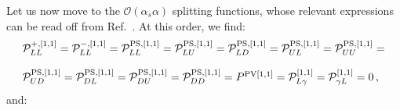 \documentclass[10pt,a4paper]{article}
\begin{document}
Let us now move to the $\mathcal{O}(\alpha_s\alpha)$ splitting
functions, whose relevant expressions can be read off from
Ref.~\cite{deFlorian:2015ujt}. At this order, we find:
\begin{equation}
\begin{array}{l}
\mathcal{P}_{LL}^{+,[1,1]}=\mathcal{P}_{LL}^{-,[1,1]}=\mathcal{P}^{\rm PS,[1,1]}_{LL}=\mathcal{P}^{\rm
  PS,[1,1]}_{LU}=\mathcal{P}^{\rm PS,[1,1]}_{LD}=\mathcal{P}^{\rm
  PS,[1,1]}_{UL}=\mathcal{P}^{\rm PS,[1,1]}_{UU}=\\
  \\
  \mathcal{P}^{\rm
  PS,[1,1]}_{UD}=\mathcal{P}^{\rm
  PS,[1,1]}_{DL}=\mathcal{P}^{\rm PS,[1,1]}_{DU}=\mathcal{P}^{\rm
  PS,[1,1]}_{DD}= P^{\rm PV [1,1]}=\mathcal{P}_{L\gamma}^{[1,1]}=\mathcal{P}_{\gamma L}^{[1,1]}=0\,,
\end{array}
\end{equation}
and:
\end{document}
